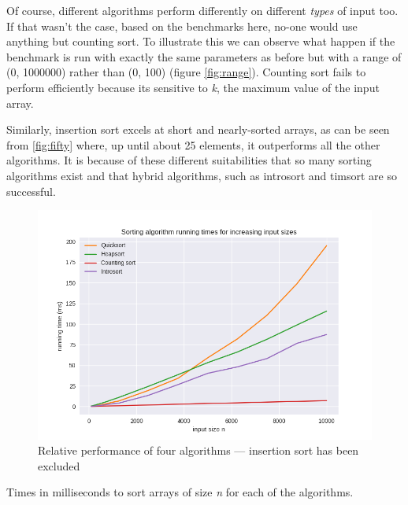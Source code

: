 \documentclass[12pt, a4paper]{article}
\begin{document}
Of course, different algorithms perform differently on different \emph{types} of input too. If that wasn't the case, based on the benchmarks here, no-one would use anything but counting sort. To illustrate this we can observe what happen if the benchmark is run with exactly the same parameters as before but with a range of (0, 1000000) rather than (0, 100) (figure \ref{fig:range}). Counting sort fails to perform efficiently because its sensitive to \emph{k}, the maximum value of the input array.

Similarly, insertion sort excels at short and nearly-sorted arrays, as can be seen from \ref{fig:fifty} where, up until about 25 elements, it outperforms all the other algorithms. It is because of these different suitabilities that so many sorting algorithms exist and that hybrid algorithms, such as introsort and timsort are so successful.

\begin{figure}
    \includegraphics[width=\linewidth]{bm_output/plot_1_linear_20210513-101605.png}
    \caption{Relative performance of four algorithms — insertion sort has been excluded}
    \label{fig:linear4}
\end{figure}


\begin{table}[H]
    \resizebox{\textwidth}{!}{%
    
    }
\caption{Times in milliseconds to sort arrays of size \emph{n} for each of the algorithms.}
\label{table:results}
\end{table}
\end{document}
